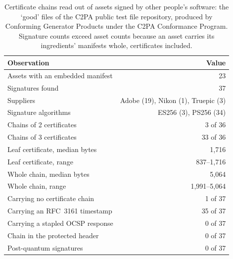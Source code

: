 \begin{table}[t]
\caption{Certificate chains read out of assets signed by other people's software: the `good' files of the C2PA public test file repository, produced by Conforming Generator Products under the C2PA Conformance Program. Signature counts exceed asset counts because an asset carries its ingredients' manifests whole, certificates included.}
\label{tab:prodchains}
\begin{tabular}{lr}
\toprule
Observation & Value\\
\midrule
Assets with an embedded manifest & 23\\
Signatures found & 37\\
Suppliers & \multicolumn{1}{r}{Adobe (19), Nikon (1), Truepic (3)}\\
Signature algorithms & \multicolumn{1}{r}{ES256 (3), PS256 (34)}\\
\midrule
Chains of 2 certificates & 3 of 36\\
Chains of 3 certificates & 33 of 36\\
Leaf certificate, median bytes & 1,716\\
Leaf certificate, range & 837--1,716\\
Whole chain, median bytes & 5,064\\
Whole chain, range & 1,991--5,064\\
\midrule
Carrying no certificate chain & 1 of 37\\
Carrying an RFC~3161 timestamp & 35 of 37\\
Carrying a stapled OCSP response & 0 of 37\\
Chain in the protected header & 0 of 37\\
Post-quantum signatures & 0 of 37\\
\bottomrule
\end{tabular}
\end{table}
